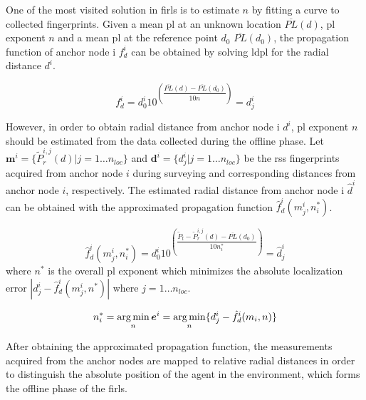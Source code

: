     One of the most visited solution in \gls{firl}s is to estimate $n$ by fitting a curve to collected fingerprints.
    Given a mean \gls{pl} at an unknown location $\overline{PL}(d)$, \gls{pl} exponent $n$ and a mean \gls{pl} at the reference point $d_0$ $\overline{PL}(d_0)$, the propagation function of anchor node i $f^i_{d}$ can be obtained by solving \gls{ldpl} for the radial distance $d^i$.

    \begin{equation}
      \label{eq:log-distance-d}
      f^i_{d} = d^i_0 10^{\left(\dfrac{\overline{PL}(d)-\overline{PL}(d_0)}{10 n} \right)} = d^i_j
    \end{equation}


    However, in order to obtain radial distance from anchor node i $d^i$, \gls{pl} exponent $n$ should be estimated from the data collected during the offline phase.
    Let $\bm{m}^i = \{\widetilde{P}_r^{i,j}(d) | j=1 \ldots n_{loc} \}$ and $\bm{d}^i = \{ d^i_j | j = 1 \ldots n_{loc}\}$ be the \gls{rss} fingerprints acquired from anchor node $i$ during surveying and corresponding distances from anchor node $i$, respectively.
    The estimated radial distance from anchor node i $\hat{d}^i$ can be obtained with the approximated propagation function $\hat{f}^i_d(m^i_j, n_i^*)$.

    \begin{equation}
      \label{eq:log-distance-d-app}
      \hat{f}^i_d(m^i_j, n_i^*) = d^i_0 10^{\left(\dfrac{\widetilde{P}_t - \widetilde{P}_r^{i,j}(d) - \overline{PL}(d_0)}{10 n_i^*} \right)} = \hat{d}^i_j
    \end{equation}
    where $n^*$ is the overall \gls{pl} exponent which minimizes the absolute localization error $|d^i_j - \hat{f}^i_d(m^i_j, n^*)|$ where  $j = 1 \ldots n_{loc}$.

    \begin{equation}
      n^*_i = \operatorname*{arg\,min}_n \bm{e}^i  = \operatorname*{arg\,min}_n \{d^i_j - \hat{f}^i_d(m_i, n)\}
    \end{equation}

    After obtaining the approximated propagation function, the measurements acquired from the anchor nodes are mapped to relative radial distances in order to distinguish the absolute position of the agent in the environment, which forms the offline phase of the \gls{firl}s.
